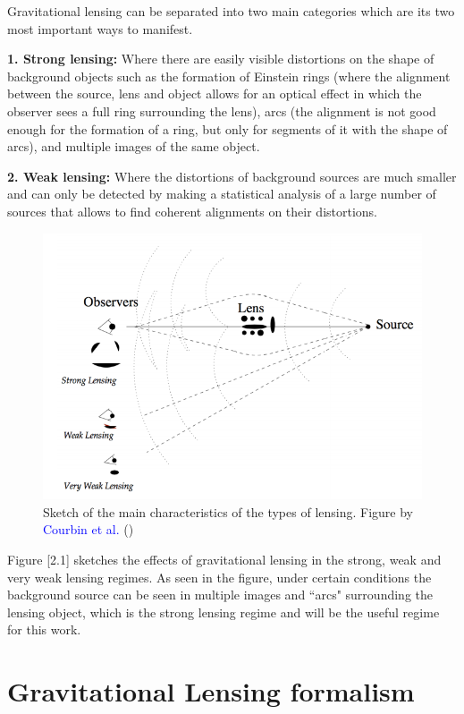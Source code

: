 Gravitational lensing can be separated into two main categories which are its two most important ways to manifest.

\textbf{1. Strong lensing:} Where there are easily visible distortions on the shape of background objects such as the formation of Einstein rings (where the alignment between the source, lens and object allows for an optical effect in which the observer sees a full ring surrounding the lens), arcs (the alignment is not good enough for the formation of a ring, but only for  segments of it with the shape of arcs), and multiple images of the same object.

\textbf{2. Weak lensing:} Where the distortions of background sources are much smaller and can only be detected by making a statistical analysis of a large number of sources that allows to find coherent alignments on their distortions.

\begin{figure}[H]
\centering
\includegraphics[width=12cm]{images/types_of_lensing.png}
\caption[Types of lensing]{Sketch of the main characteristics of the types of lensing. Figure by \textcolor{blue}{Courbin et al.} (\citeyear{Reference24})}
\end{figure}

Figure [2.1] sketches the effects of gravitational lensing in the strong, weak and very weak lensing regimes. As seen in the figure, under certain conditions the background source can be seen in multiple images and ``arcs" surrounding the lensing object, which is the strong lensing regime and will be the useful regime for this work. 

\section{Gravitational Lensing formalism}

